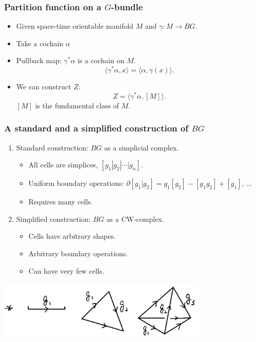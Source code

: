 \documentclass[xcolor=table, aspectratio=43,ignorenonframetext]{beamer}
\begin{document}
\begin{frame}
	\frametitle{Partition function on a $G$-bundle}
	\begin{itemize}
		\item Given space-time orientable manifold $M$ and $\gamma:M\rightarrow BG$.
		\item Take a cochain $\alpha$
		\item Pullback map: $\gamma^\ast\alpha$ is a cochain on $M$.
		\[\langle \gamma^\ast\alpha, x\rangle = \langle \alpha,\gamma(x)\rangle.\]
		\item We can construct $Z$:
		\[Z = \langle\gamma^\ast\alpha, [M]\rangle.\]
		$[M]$ is the fundamental class of $M$.
	\end{itemize}
\end{frame}

\begin{frame}
	\frametitle{A standard and a simplified construction of $BG$}
	\begin{enumerate}
		\item Standard construction: $BG$ as a simplicial complex.
		\begin{itemize}
			\item All cells are simplices, $[g_1|g_2|\cdots|g_n]$.
			\item Uniform boundary operations:
			$\partial[g_1|g_2]=g_1[g_2]-[g_1g_2]+[g_1]$, ...
			\item Requires many cells.
		\end{itemize}
		\item Simplified construction: $BG$ as a CW-complex.
		\begin{itemize}
			\item Cells have arbitrary shapes.
			\item Arbitrary boundary operations.
			\item Can have very few cells.
		\end{itemize}
	\end{enumerate}
	\begin{center}
		\includegraphics[width=10cm]{../chainmap/bg-std}
	\end{center}
\end{frame}
\end{document}

